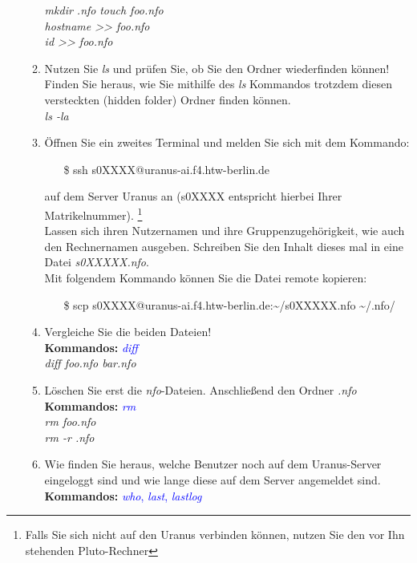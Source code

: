 \documentclass[paper=a4,fontsize=11pt]{scrartcl}%
\numberwithin{equation}{section}
\begin{document}
\begin{enumerate}
\begin{enumerate}
          \textit{mkdir .nfo}
          \textit{touch foo.nfo}\\
          \textit{hostname >> foo.nfo}\\
          \textit{id >> foo.nfo}
          \item Nutzen Sie \emph{ls} und prüfen Sie, ob Sie den Ordner wiederfinden können! Finden Sie heraus, wie Sie mithilfe des \emph{ls} Kommandos trotzdem diesen versteckten (hidden folder) Ordner finden können.\\
           \textit{ls -la}  
          \item Öffnen Sie ein zweites Terminal und melden Sie sich mit dem Kommando:
          \begin{itemize}
          \item[\$]ssh s0XXXX@uranus-ai.f4.htw-berlin.de
          \end{itemize}
           auf dem Server Uranus an (s0XXXX entspricht hierbei Ihrer Matrikelnummer). \footnote{Falls Sie sich nicht auf den Uranus verbinden können, nutzen Sie den vor Ihn stehenden Pluto-Rechner} \\
           Lassen sich ihren Nutzernamen und ihre Gruppenzugehörigkeit, wie auch den Rechnernamen ausgeben. Schreiben Sie den Inhalt dieses mal in eine Datei \emph{s0XXXXX.nfo}.\\
           Mit folgendem Kommando können Sie die Datei remote kopieren: 
           \begin{itemize}
          \item[\$]scp s0XXXX@uranus-ai.f4.htw-berlin.de:\textasciitilde /s0XXXXX.nfo \textasciitilde/.nfo/
          \end{itemize}
          \item Vergleiche Sie die beiden Dateien!\\
          \textbf{Kommandos:} \textcolor{blue}{\emph{diff}}\\
          \textit{diff foo.nfo bar.nfo}
          \item Löschen Sie erst die \emph{nfo}-Dateien. Anschließend den Ordner \emph{.nfo}\\
          \textbf{Kommandos:} \textcolor{blue}{\emph{rm}}\\
           \textit{rm foo.nfo}\\
          \textit{rm -r .nfo}
          \item Wie finden Sie heraus, welche Benutzer noch auf dem Uranus-Server eingeloggt sind und wie lange diese auf dem Server angemeldet sind.\\
          \textbf{Kommandos:} \textcolor{blue}{\emph{who}, \emph{last}, \emph{lastlog}}

\end{enumerate}
\end{enumerate}
\end{document}
